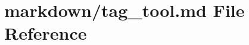 \hypertarget{tag__tool_8md}{}\section{markdown/tag\+\_\+tool.md File Reference}
\label{tag__tool_8md}
